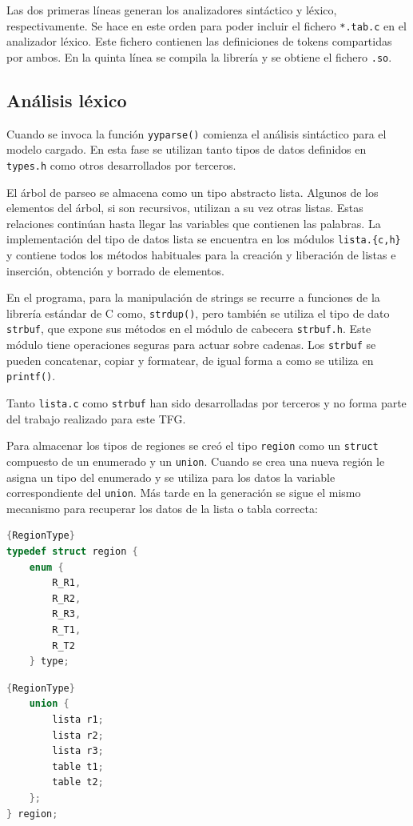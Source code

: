 Las dos primeras líneas generan los analizadores sintáctico y léxico, respectivamente. Se hace en este orden para poder incluir el fichero \verb|*.tab.c| en el analizador léxico. Este fichero contienen las definiciones de tokens compartidas por ambos. En la quinta línea se compila la librería y se obtiene el fichero \verb|.so|.

\subsection{Análisis léxico}

Cuando se invoca la función \verb|yyparse()| comienza el análisis sintáctico para el modelo cargado. En esta fase se utilizan tanto tipos de datos definidos en \verb|types.h| como otros desarrollados por terceros. 

El árbol de parseo se almacena como un tipo abstracto lista. Algunos de los elementos del árbol, si son recursivos, utilizan a su vez otras listas. Estas relaciones continúan hasta llegar las variables que contienen las palabras. La implementación del tipo de datos lista se encuentra en los módulos \verb|lista.{c,h}| y contiene todos los métodos habituales para la creación y liberación de listas e inserción, obtención y borrado de elementos. 

En el programa, para la manipulación de strings se recurre a funciones de la librería estándar de C como, \verb|strdup()|, pero también se utiliza el tipo de dato \verb|strbuf|, que expone sus métodos en el módulo de cabecera \verb|strbuf.h|. Este módulo tiene operaciones seguras para actuar sobre cadenas. Los \verb|strbuf| se pueden concatenar, copiar y formatear, de igual forma a como se utiliza en \verb|printf()|.

Tanto \verb|lista.c| como \verb|strbuf| han sido desarrolladas por terceros y no forma parte del trabajo realizado para este TFG.

Para almacenar los tipos de regiones se creó el tipo \verb|region| como un \verb|struct| compuesto de un enumerado y un \verb|union|. Cuando se crea una nueva región le asigna un tipo del enumerado y se utiliza para los datos la variable correspondiente del \verb|union|. Más tarde en la generación se sigue el mismo mecanismo para recuperar los datos de la lista o tabla correcta:

\noindent\begin{minipage}{.45\textwidth}
    \begin{lstlisting}[language=C,caption={},frame=tlrb,label={}]{RegionType}
typedef struct region {
    enum {
        R_R1,
        R_R2,
        R_R3,
        R_T1,
        R_T2
    } type;
    \end{lstlisting}
\end{minipage}\hfill
\begin{minipage}{.45\textwidth}
    \begin{lstlisting}[language=C,caption={},frame=tlrb,label={}]{RegionType}
    union {
        lista r1;
        lista r2;
        lista r3;
        table t1;
        table t2;
    };
} region;
    \end{lstlisting}
\end{minipage}

